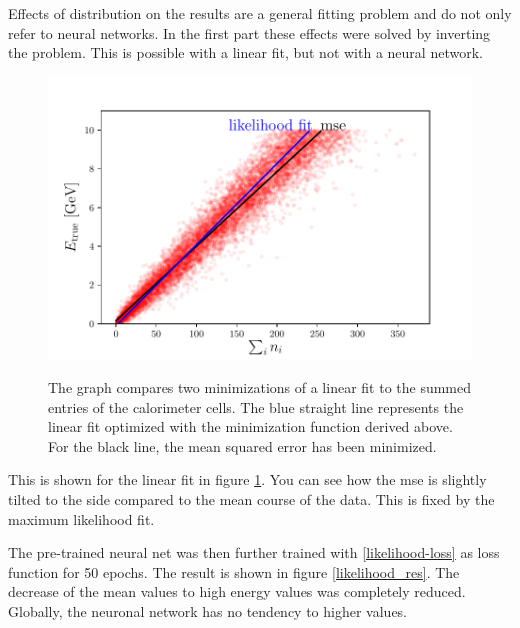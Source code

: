 \documentclass[12pt, a4paper]{thesis}
\begin{document}
Effects of distribution on the results are a general fitting problem
and do not only refer to neural networks. In the first part these
effects were solved by inverting the problem. This is possible with a
linear fit, but not with a neural network.

\begin{figure}[htbp] \centering
\includegraphics[width=.9\linewidth]{../images/e-vs-sum_n_like.pdf}
\label{e-vs-sum_n_like}
\caption{ The graph compares two minimizations of a linear fit to the
  summed entries of the calorimeter cells. The blue straight line
  represents the linear fit optimized with the minimization function
  derived above. For the black line, the mean squared error has been
  minimized.}
\end{figure}

This is shown for the linear fit in figure \ref{e-vs-sum_n_like}. You
can see how the mse is slightly tilted to the side compared to the
mean course of the data. This is fixed by the maximum likelihood fit.

The pre-trained neural net was then further trained with
\eqref{likelihood-loss} as loss function for 50 epochs. The result is
shown in figure \ref{likelihood_res}. The decrease of the mean values
to high energy values was completely reduced. Globally, the neuronal
network has no tendency to higher values.
\end{document}
